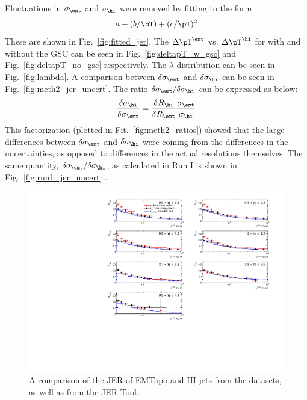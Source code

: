 Fluctuations in $\sigma_\emt$ and $\sigma_\hi$ were removed by fitting to the form
\begin{align}
a+(b/\pT)+(c/\pT)^2
\label{fit:jer_fit}
\end{align}
These are shown in Fig.~\ref{fig:fitted_jer}. The $\Delta\pT^\emt$ vs. $\Delta\pT^\hi$ for with and without the GSC can be seen in Fig.~\ref{fig:deltapT_w_gsc} and Fig.~\ref{fig:deltapT_no_gsc} respectively. The $\lambda$ distribution can be seen in Fig.~\ref{fig:lambda}. A comparison between $\delta\sigma_\emt$ and $\delta\sigma_\hi$ can be seen in Fig.~\ref{fig:meth2_jer_uncert}. The ratio $\delta\sigma_\emt / \delta\sigma_\hi$ can be expressed as below:
\begin{align}
\frac{\delta\sigma_\hi}{\delta\sigma_\emt} = \frac{\delta R_\hi}{\delta R_\emt} \frac{\sigma_\emt}{\sigma_\hi}
\end{align}
This factorization (plotted in Fit.~\ref{fig:meth2_ratios}) showed that the large differences between $\delta\sigma_\emt$ and $\delta\sigma_\hi$ were coming from the differences in the uncertainties, as opposed to differences in the actual resolutions themselves. The same quantity, $\delta\sigma_\emt / \delta\sigma_\hi$, as calculated in Run I is shown in Fig.~\ref{fig:run1_jer_uncert} \cite{xcalib_run1}.





\begin{figure}
    \centering
        \includegraphics[width=1\textwidth]{figures/qualification/emtopo_jer}
		\caption{A comparison of the JER of EMTopo and HI jets from the datasets, as well as from the JER Tool. }
		\label{fig:emtopo_jer}
    \end{figure}%

